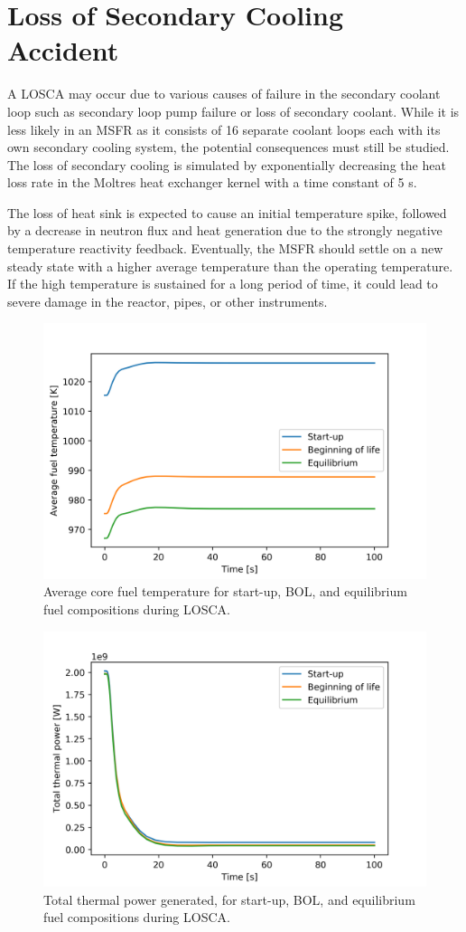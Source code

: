 \documentclass{anstrans}
\begin{document}
\section{Loss of Secondary Cooling Accident}

	A \gls{LOSCA} may occur due to various causes of failure in the secondary
	coolant loop such as secondary loop pump failure or loss of secondary
	coolant. While it is less likely in an \gls{MSFR} as it consists of 16
	separate coolant loops each with its own secondary cooling system, the
	potential consequences must still be studied.
	The loss of secondary cooling is simulated by exponentially decreasing
	the heat loss rate in the Moltres heat exchanger kernel with a time
	constant of 5 s.
	
	The loss of heat sink is expected to cause an initial temperature spike,
	followed by a decrease in neutron flux and heat generation due to the
	strongly negative temperature reactivity feedback. Eventually, the
	\gls{MSFR} should settle on a new steady state with a higher average
	temperature than the operating temperature. If the high temperature is
	sustained for a long period of time, it could lead to severe damage
	in the reactor, pipes, or other instruments.
	
\begin{figure}[b] 
	\centering
	\includegraphics[width=.53\textwidth]{./figures/loscatemp}
	\captionsetup{justification=centering}
	\caption{Average core fuel temperature for start-up, \gls{BOL}, and
	equilibrium fuel compositions during \gls{LOSCA}.}
	\label{fig:loscatemp}
\end{figure} 
%
\begin{figure}[t] 
	\centering
	\includegraphics[width=.53\textwidth]{./figures/loscaheat}
	\captionsetup{justification=centering}
	\caption{Total thermal power generated, for start-up, \gls{BOL}, and
	 equilibrium fuel compositions during \gls{LOSCA}.}
	\label{fig:loscaheat}
\end{figure} 
\end{document}
